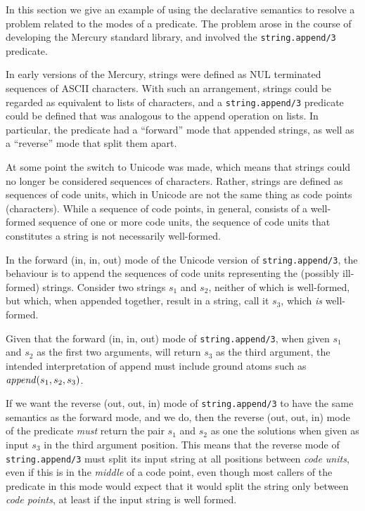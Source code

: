In this section we give an example
of using the declarative semantics to resolve a problem
related to the modes of a predicate.
The problem arose in the course of developing the Mercury standard library,
and involved the \texttt{string.append/3} predicate.

In early versions of the Mercury,
strings were defined as NUL terminated sequences of ASCII characters.
With such an arrangement,
strings could be regarded as equivalent to lists of characters,
and a \texttt{string.append/3} predicate could be defined
that was analogous to the append operation on lists.
In particular,
the predicate had a ``forward'' mode that appended strings,
as well as a ``reverse'' mode that split them apart.

At some point the switch to Unicode was made,
which means that strings could no longer
be considered sequences of characters.
Rather, strings are defined as sequences of code units,
which in Unicode are not the same thing as code points (characters).
While a sequence of code points, in general,
consists of a well-formed sequence of one or more code units,
the sequence of code units that constitutes a string
is not necessarily well-formed.

In the forward (in, in, out) mode
of the Unicode version of \texttt{string.append/3},
the behaviour is to append the sequences of code units representing
the (possibly ill-formed) strings.
Consider two strings $s_1$ and $s_2$,
neither of which is well-formed,
but which, when appended together, result in a string,
call it $s_3$, which \emph{is} well-formed.

Given that the forward (in, in, out) mode of \texttt{string.append/3},
when given $s_1$ and $s_2$ as the first two arguments,
will return $s_3$ as the third argument,
the intended interpretation of append
must include ground atoms such as $\text{\textit{append}}(s_1, s_2, s_3)$.

If we want the reverse (out, out, in) mode of \texttt{string.append/3}
to have the same semantics as the forward mode, and we do,
then the reverse (out, out, in) mode of the predicate
\emph{must} return the pair $s_1$ and $s_2$ as one the solutions
when given as input $s_3$ in the third argument position.
This means that the reverse mode of \texttt{string.append/3}
must split its input string
at all positions between \emph{code units},
even if this is in the \emph{middle} of a code point,
even though most callers of the predicate in this mode
would expect that it would split the string only between \emph{code points},
at least if the input string is well formed.

